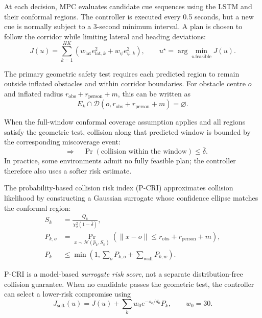 \documentclass[11pt,a4paper]{article}
\begin{document}
At each decision, MPC evaluates candidate cue sequences using the LSTM and their conformal regions. The controller is executed every 0.5 seconds, but a new cue is normally subject to a 3-second minimum interval. A plan is chosen to follow the corridor while limiting lateral and heading deviations:
\begin{equation}
 J(u)=\sum_{k=1}^{HK}\left(w_{\mathrm{lat}}e_{\mathrm{lat},k}^2+
 w_\psi e_{\psi,k}^2\right),
 \qquad u^\star=\arg\min_{u\,\mathrm{feasible}}J(u).
\end{equation}

The primary geometric safety test requires each predicted region to remain outside inflated obstacles and within corridor boundaries. For obstacle centre $o$ and inflated radius $r_{\mathrm{obs}}+r_{\mathrm{person}}+m$, this can be written as
\begin{equation}
 E_k\cap\mathcal D\!\left(o,r_{\mathrm{obs}}+r_{\mathrm{person}}+m\right)=\varnothing.
\end{equation}

When the full-window conformal coverage assumption applies and all regions satisfy the geometric test, collision along that predicted window is bounded by the corresponding miscoverage event:
\begin{equation}
 [\text{all predicted regions avoid obstacles and walls}]
 \quad\Longrightarrow\quad
 \Pr(\text{collision within the window})\le\bar\delta.
\end{equation}
In practice, some environments admit no fully feasible plan; the controller therefore also uses a softer risk estimate.

The probability-based collision risk index (P-CRI) approximates collision likelihood by constructing a Gaussian surrogate whose confidence ellipse matches the conformal region:
\begin{align}
 S_k&=\frac{Q_k}{\chi_2^2(1-\bar\delta)},\\
 P_{k,o}&=\Pr_{x\sim\mathcal N(\hat p_k,S_k)}
 \!\left(\|x-o\|\le r_{\mathrm{obs}}+r_{\mathrm{person}}+m\right),\\
 P_k&\le\min\left(1,\sum_oP_{k,o}+\sum_{\mathrm{wall}}P_{k,w}\right).
\end{align}

P-CRI is a model-based \emph{surrogate risk score}, not a separate distribution-free collision guarantee. When no candidate passes the geometric test, the controller can select a lower-risk compromise using
\begin{equation}
 J_{\mathrm{soft}}(u)=J(u)+\sum_k w_0e^{-s_k/d_0}P_k,
 \qquad w_0=30.
\end{equation}
\end{document}
